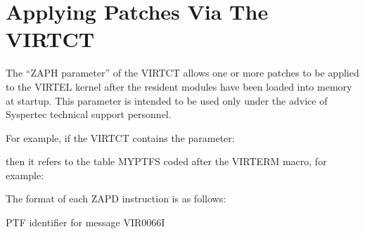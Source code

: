 \documentclass[letterpaper,10pt,english]{sphinxmanual}
\begin{document}
\section{Applying Patches Via The VIRTCT}
\label{\detokenize{Installation_Guide:applying-patches-via-the-virtct}}\label{\detokenize{Installation_Guide:index-152}}
\sphinxAtStartPar
The “ZAPH parameter” of the VIRTCT allows one or more patches to be applied to the VIRTEL kernel after the resident modules have been loaded into memory at startup. This parameter is intended to be used only under the advice of Syspertec technical support personnel.

\sphinxAtStartPar
For example, if the VIRTCT contains the parameter:

\begin{sphinxVerbatim}[commandchars=\\\{\}]
 
\end{sphinxVerbatim}

\sphinxAtStartPar
then it refers to the table MYPTFS coded after the VIRTERM macro, for example:

\begin{sphinxVerbatim}[commandchars=\\\{\}]
   
  
   
\end{sphinxVerbatim}

\sphinxAtStartPar
The format of each ZAPD instruction is as follows:

\begin{sphinxVerbatim}[commandchars=\\\{\}]
  
\end{sphinxVerbatim}

\sphinxAtStartPar
{} \sphinxhyphen{} PTF identifier for message VIR0066I
\end{document}
